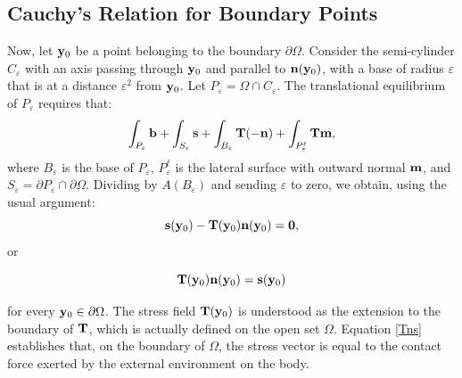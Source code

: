 \subsection{Cauchy’s Relation for Boundary Points}
Now, let \(\mathbf{y}_0\) be a point belonging to the boundary \(\partial\Omega\). Consider the semi-cylinder \(C_\varepsilon\) with an axis passing through \(\mathbf{y}_0\) and parallel to \(\mathbf{n}(\mathbf{y}_0)\), with a base of radius \(\varepsilon\) that is at a distance \(\varepsilon^2\) from \(\mathbf{y}_0\). Let \(P_\varepsilon = \Omega \cap C_\varepsilon\). The translational equilibrium of \(P_\varepsilon\) requires that:
\begin{equation}
	\int_{P_\varepsilon} \mathbf{b} + \int_{S_\varepsilon} \mathbf{s} + \int_{B_\varepsilon} \mathbf{T}(-\mathbf{n}) + \int_{P_\varepsilon^\ell} \mathbf{T} \mathbf{m},
\end{equation}
where \(B_\varepsilon\) is the base of \(P_\varepsilon\), \(P_\varepsilon^\ell\) is the lateral surface with outward normal \(\mathbf{m}\), and \(S_\varepsilon = \partial P_\varepsilon \cap \partial \Omega\). Dividing by \(A(B_\varepsilon)\) and sending \(\varepsilon\) to zero, we obtain, using the usual argument:
\begin{equation}
	\mathbf{s}(\mathbf{y}_0) - \mathbf{T}(\mathbf{y}_0) \mathbf{n}(\mathbf{y}_0) = \mathbf{0},
\end{equation}
or
\begin{definition}
	\begin{equation}\label{Tns}
		\mathbf{T}(\mathbf{y}_0) \mathbf{n}(\mathbf{y}_0) = \mathbf{s}(\mathbf{y}_0)
	\end{equation}
\end{definition}
for every \(\mathbf{y}_0 \in \partial \Omega\). The stress field \(\mathbf{T}(\mathbf{y}_0)\) is understood as the extension to the boundary of \(\mathbf{T}\), which is actually defined on the open set \(\Omega\). Equation \eqref{Tns} establishes that, on the boundary of \(\Omega\), the stress vector is equal to the contact force exerted by the external environment on the body.

